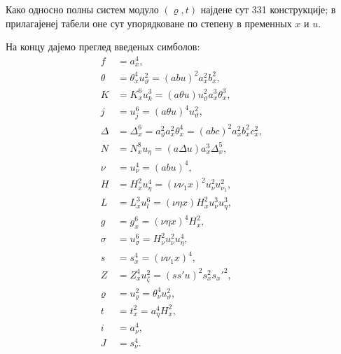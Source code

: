﻿\documentclass[11pt]{article}
\begin{document}
Како односно полны систем модуло $(\varrho,t)$ најдене сут 331 конструкције; в прилагајенеј табели оне сут упорядковане по степену в пременных $x$ и $u$.

На концу дајемо преглед введеных симболов:
\begin{align*}
f&=a_x^4,\\
\theta&=\theta_x^4u_\vartheta^2=(abu)^2a_x^2b_x^2,\\
K&=K_x^6u_k^3=(a\theta u)u_\vartheta^2a_x^3\theta_x^3,\\
j&=u_j^6=(a\theta u)^4u_\vartheta^2,\\
\Delta&=\Delta_x^6=a_\vartheta^2a_x^2\theta_x^4=(abc)^2a_x^2b_x^2c_x^2,\\
N&=N_x^8u_\eta=(a\Delta u)a_x^3\Delta_x^5,\\
\nu&=u_\nu^4=(abu)^4,\\
H&=H_x^2u_\eta^4=(\nu\nu_1x)^2u_\nu^2u_{\nu_1}^2,\\
L&=L_x^3u_l^6=(\nu\eta x)H_x^2u_\nu^3u_\eta^3,\\
g&=g_x^6=(\nu\eta x)^4H_x^2,\\
\sigma&=u_\sigma^6=H_\nu^2u_\nu^2u_\eta^4,\\
s&=s_x^4=(\nu\nu_1x)^4,\\
Z&=Z_x^4u_\zeta^2=(ss'u)^2s_x^2s_x'^2,\\
\varrho&=u_\varrho^2=\theta_\nu^4u_\vartheta^2,\\
t&=t_x^2=a_\eta^4H_x^2,\\
i&=a_\nu^4,\\
J&=s_\nu^4.
\end{align*}
\end{document}
